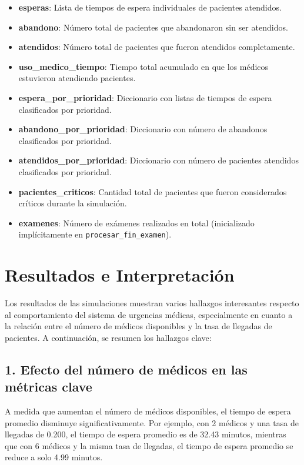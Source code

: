 \documentclass[12pt]{article}
\begin{document}
\begin{itemize}
  \item \textbf{esperas}: Lista de tiempos de espera individuales de pacientes atendidos.
  \item \textbf{abandono}: Número total de pacientes que abandonaron sin ser atendidos.
  \item \textbf{atendidos}: Número total de pacientes que fueron atendidos completamente.
  \item \textbf{uso\_medico\_tiempo}: Tiempo total acumulado en que los médicos estuvieron atendiendo pacientes.
  \item \textbf{espera\_por\_prioridad}: Diccionario con listas de tiempos de espera clasificados por prioridad.
  \item \textbf{abandono\_por\_prioridad}: Diccionario con número de abandonos clasificados por prioridad.
  \item \textbf{atendidos\_por\_prioridad}: Diccionario con número de pacientes atendidos clasificados por prioridad.
  \item \textbf{pacientes\_criticos}: Cantidad total de pacientes que fueron considerados críticos durante la simulación.
  \item \textbf{examenes}: Número de exámenes realizados en total (inicializado implícitamente en \texttt{procesar\_fin\_examen}).
\end{itemize}


\section{Resultados e Interpretación}
Los resultados de las simulaciones muestran varios hallazgos interesantes respecto al comportamiento del sistema de urgencias médicas, especialmente en cuanto a la relación entre el número de médicos disponibles y la tasa de llegadas de pacientes. A continuación, se resumen los hallazgos clave:

\subsection{1. Efecto del número de médicos en las métricas clave}
A medida que aumentan el número de médicos disponibles, el tiempo de espera promedio disminuye significativamente. Por ejemplo, con 2 médicos y una tasa de llegadas de 0.200, el tiempo de espera promedio es de 32.43 minutos, mientras que con 6 médicos y la misma tasa de llegadas, el tiempo de espera promedio se reduce a solo 4.99 minutos.
\end{document}
